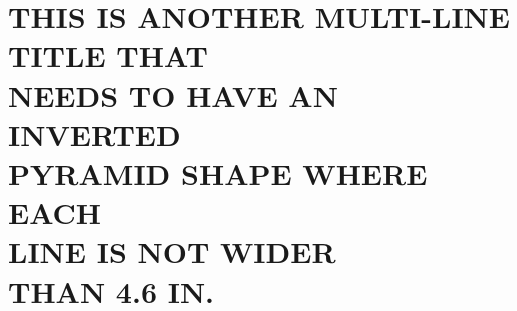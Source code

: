 \documentclass[../Dissertation]{subfiles}
\begin{document}
    \chapter[\uppercase{This Is Another Multi-Line Title That Needs To Have An
    \protect\\Inverted Pyramid Shape Where Each Line Is Not Wider Than 4.6
    in.}]{\uppercase{This Is Another Multi-Line Title That \protect\\Needs To
    Have An Inverted \protect\\Pyramid Shape Where Each \protect\\Line Is Not
    Wider \protect\\Than 4.6 in.}}\label{chp:4}
    
    
    \vspace{-2ex}
    
    
    
    
    
    
    
    
    
    \printbibliography[segment=\therefsegment,heading=references]
    
\end{document}
